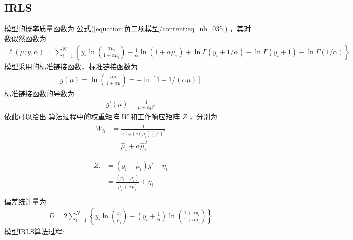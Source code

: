 \documentclass[letterpaper,10pt,english]{sphinxmanual}
\begin{document}
\subsection{IRLS}
\label{\detokenize{_u8d1f_u4e8c_u9879_u6a21_u578b/content:irls}}
 模型的概率质量函数为 公式(\ref{equation:负二项模型/content:eq_nb_035})
，其对数似然函数为
\begin{equation}\label{equation:负二项模型/content:负二项模型/content:8}
\begin{split}\ell(\mu;y,\alpha) = \sum_{i=1}^N  \left \{
y_i \ln \left (\frac{\alpha \mu_i}{1+\alpha \mu_i} \right )
- \frac{1}{\alpha} \ln (1+\alpha \mu_i)
+ \ln \Gamma(y_i+1/\alpha)
- \ln \Gamma(y_i+1) - \ln \Gamma(1/\alpha)
\right \}\end{split}
\end{equation}
 模型采用的标准链接函数，标准链接函数为
\begin{equation}\label{equation:负二项模型/content:负二项模型/content:9}
\begin{split}g(\mu) = \ln \left (\frac{\alpha \mu}{1+\alpha \mu} \right )
= - \ln [ 1+ 1/ (\alpha \mu ) ]\end{split}
\end{equation}
标准链接函数的导数为
\begin{equation}\label{equation:负二项模型/content:负二项模型/content:10}
\begin{split}g'(\mu) = \frac{1}{\mu+\alpha \mu^2}\end{split}
\end{equation}
依此可以给出  算法过程中的权重矩阵 \(W\) 和工作响应矩阵 \(Z\)
，分别为
\begin{align}\label{equation:负二项模型/content:负二项模型/content:11}\!\begin{aligned}
W_{ii} &=  \frac{ 1}{ a(\phi) \nu(\hat{\mu}_i) ( g' )^2}\\
&=
\hat{\mu}_i + \alpha \hat{\mu}_i^2\\
\end{aligned}\end{align}\begin{align}\label{equation:负二项模型/content:负二项模型/content:12}\!\begin{aligned}
Z_i &=  (y_i- \hat{\mu}_i) g'  + \eta_i\\
&=   \frac{(y_i- \hat{\mu}_i)}{\hat{\mu}_i + \alpha \hat{\mu}_i^2}  + \eta_i\\
\end{aligned}\end{align}
偏差统计量为
\begin{equation}\label{equation:负二项模型/content:负二项模型/content:13}
\begin{split}D = 2\sum_{i=1}^N \left \{
    y_i \ln \left ( \frac{y_i}{ \hat{\mu}_i} \right )
- \left ( y_i + \frac{1}{\alpha} \right ) \ln \left (  \frac{1+\alpha y_i}{1+\alpha \hat{\mu}_i} \right )
\right \}\end{split}
\end{equation}
 模型IRLS算法过程:
\end{document}
